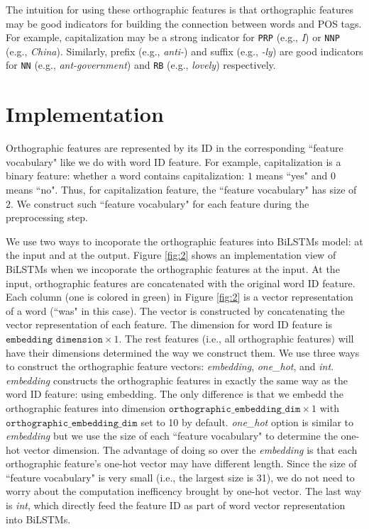\documentclass[11pt,letterpaper]{article}
\begin{document}
The intuition for using these orthographic features is that orthographic features may be good indicators for building
the connection between words and POS tags. For example, capitalization may be a strong indicator for 
\texttt{PRP} (e.g., \emph{I}) or \texttt{NNP} (e.g., \emph{China}). Similarly, prefix (e.g., \emph{anti-}) and suffix (e.g., \emph{-ly}) 
are good indicators for \texttt{NN} (e.g., \emph{ant-government}) and \texttt{RB} (e.g., \emph{lovely}) respectively.

\section{Implementation}

Orthographic features are represented by its ID in the corresponding ``feature vocabulary" like
we do with word ID feature. For example, capitalization is a binary feature: whether a word contains
capitalization: $1$ means ``yes" and $0$ means ``no". Thus, for capitalization feature, the ``feature
vocabulary" has size of $2$. We construct such ``feature vocabulary" for each feature during the preprocessing
step.

We use two ways to incoporate the orthographic features into BiLSTMs model: at the input and at the output.
Figure \ref{fig:2} shows an implementation view of BiLSTMs when we incoporate the orthographic
features at the input. At the input, orthographic features are concatenated with the original
word ID feature. Each column (one is colored in green) in Figure \ref{fig:2} is a vector representation of a word
(``was" in this case). The vector is constructed by concatenating the vector representation of each feature.
The dimension for word ID feature is $\texttt{embedding dimension} \times 1$. The rest features (i.e., all
orthographic features) will have their dimensions determined the way we construct them. We use three ways
to construct the orthographic feature vectors: \emph{embedding}, \emph{one\_hot}, and \emph{int}. \emph{embedding}
constructs the orthographic features in exactly the same way as the word ID feature: using embedding.
The only difference is that we embedd the orthographic features into dimension $\texttt{orthographic\_embedding\_dim} \times 1$
with $\texttt{orthographic\_embedding\_dim}$ set to 10 by default. \emph{one\_hot} option is similar to \emph{embedding}
but we use the size of each ``feature vocabulary" to determine the one-hot vector dimension. The advantage of
doing so over the \emph{embedding} is that each orthographic feature's one-hot vector may have different length. Since the
size of ``feature vocabulary" is very small (i.e., the largest size is 31), we do not need to worry about the computation
inefficency brought by one-hot vector. The last way is \emph{int}, which directly feed the feature ID as part of word vector
representation into BiLSTMs.
\end{document}
